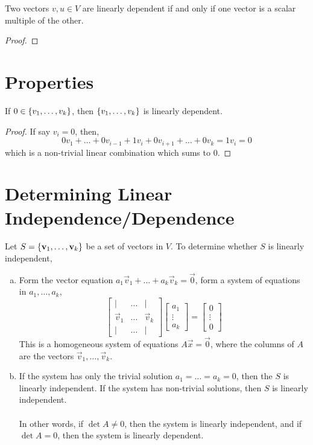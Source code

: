 \documentclass[letterpaper,12pt]{article}
\begin{document}
\begin{corollary}
Two vectors $v, u \in V$ are linearly dependent if and only if one vector is a scalar multiple of the other.
\end{corollary}

\begin{proof}

\end{proof}

\section*{Properties}
\begin{example}
If $0 \in \left\{ v_1, \dots, v_k \right\}$, then $\left\{ v_1, \dots, v_k \right\}$ is linearly dependent.
\begin{proof}
If say $v_i = 0$, then,
\begin{equation*}
    0 v_1 + \dots + 0v_{i-1} + 1 v_i + 0 v_{i+1} + \dots + 0 v_k = 1v_i = 0
\end{equation*}
which is a non-trivial linear combination which sums to 0.
\end{proof}
\end{example}

\section*{Determining Linear Independence/Dependence}

Let $S = \left\{ \mathbf{v}_1, \dots, \mathbf{v}_k \right\}$ be a set of vectors in $V$. To determine whether $S$ is linearly independent,
\begin{enumerate}[(a)]
    \item Form the vector equation $a_1 \vec{v}_1 + \dots + a_k \vec{v}_k = \vec{0}$, form a system of equations in $a_1, \dots, a_k$,
    \begin{equation*}
        \begin{bmatrix} \mid & \dots & \mid \\
        \vec{v}_1 & \dots & \vec{v}_k \\
        \mid & \dots & \mid \end{bmatrix} \begin{bmatrix} a_1 \\ \vdots \\ a_k \end{bmatrix} = \begin{bmatrix} 0 \\ \vdots \\ 0 \end{bmatrix}
    \end{equation*}
    This is a homogeneous system of equations $A\vec{x} = \vec{0}$, where the columns of $A$ are the vectors $\vec{v}_1, \dots, \vec{v}_k$.
    \item If the system has only the trivial solution $a_1 = \dots = a_k = 0$, then the $S$ is linearly independent. If the system has non-trivial solutions, then $S$ is linearly independent.
    \\ \\ In other words, if $\det{A} \neq 0$, then the system is linearly independent, and if $\det{A} = 0$, then the system is linearly dependent.
\end{enumerate}
\end{document}
